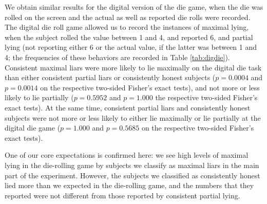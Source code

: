 \documentclass[12pt]{article}
\begin{document}
\par We obtain similar results for the digital version of the die game, when the die was rolled on the screen and the actual as well as reported die rolls were recorded.\footnotemark{}
The digital die roll game allowed us to record the instances of maximal lying, when the subject rolled the value between 1 and 4, and reported 6, and partial lying (not reporting either 6 or the actual value, if the latter was between 1 and 4; the frequencies of these behaviors are recorded in Table \ref{tab:digdie}). Consistent maximal liars were more likely to lie maximally on the digital die task than either consistent partial liars or consistently honest subjects ($p=0.0004$ and $p=0.0014$ on the respective two-sided Fisher's exact tests), and not more or less likely to lie partially ($p=0.5952$ and $p=1.000$ the respective two-sided Fisher's exact tests). At the same time, consistent partial liars and consistently honest subjects were not more or less likely to either lie maximally or lie partially at the digital die game ($p=1.000$ and $p=0.5685$ on the respective two-sided Fisher's exact tests).\footnotemark{}
\label{stata:digdie}

\par One of our core expectations is confirmed here: we see high levels of maximal lying in the die-rolling game by subjects we classify as maximal liars in the main part of the experiment. However, the subjects we classified as consistently honest lied more than we expected in the die-rolling game, and the numbers that they reported were not different from those reported by consistent partial lying.
\end{document}
